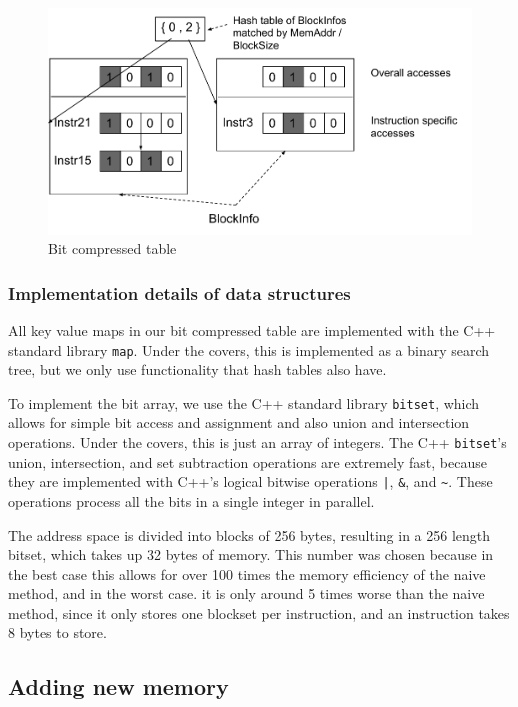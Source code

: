 \documentclass[12pt,twoside]{reedthesis}
\begin{document}
			\begin{figure}[h]
				\caption{Bit compressed table}
				\label{fig:bit-comp-idea}
				\includegraphics[scale=0.85]{BlockSet_accesses.pdf}
			\end{figure}
		
			\subsubsection{Implementation details of data structures}
			
			All key value maps in our bit compressed table are implemented with the C++ standard library \texttt{map}. Under the covers, this is implemented as a binary search tree, but we only use functionality that hash tables also have. 
			
			To implement the bit array, we use the C++ standard library \texttt{bitset}, which allows for simple bit access and assignment and also union and intersection operations. Under the covers, this is just an array of integers. The C++ \texttt{bitset}'s union, intersection, and set subtraction operations are extremely fast, because they are implemented with C++'s logical bitwise operations \texttt{|}, \texttt{\&}, and \texttt{\~}. These operations process all the bits in a single integer in parallel. 
			
			The address space is divided into blocks of 256 bytes, resulting in a 256 length bitset, which takes up 32 bytes of memory. This number was chosen because in the best case this allows for over 100 times the memory efficiency of the naive method, and in the worst case. it is only around 5 times worse than the naive method, since it only stores one blockset per instruction, and an instruction takes 8 bytes to store. 
			
			\subsection{Adding new memory}
			
\end{document}
